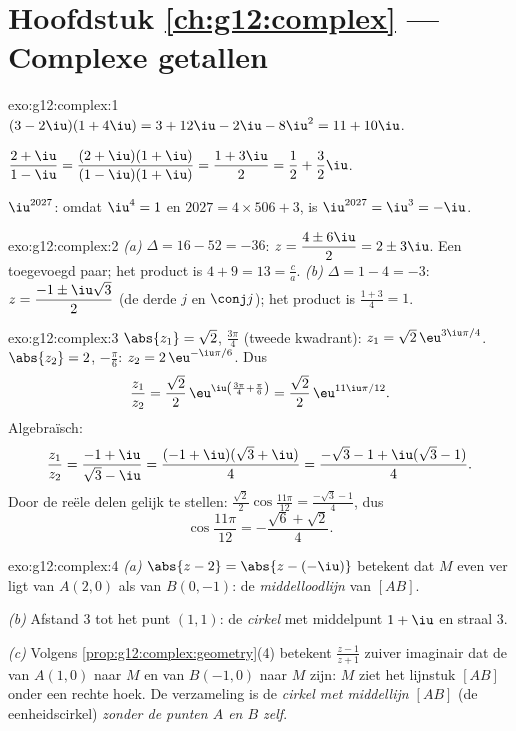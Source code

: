 \section*{Hoofdstuk \ref{ch:g12:complex} --- Complexe getallen}

\begin{solution}{exo:g12:complex:1}
$(3-2\iu)(1+4\iu) = 3 + 12\iu - 2\iu - 8\iu^2 = 11 + 10\iu$.

$\dfrac{2+\iu}{1-\iu} = \dfrac{(2+\iu)(1+\iu)}{(1-\iu)(1+\iu)}
= \dfrac{1 + 3\iu}{2} = \dfrac12 + \dfrac32\iu$.

$\iu^{2027}$: omdat $\iu^4 = 1$ en $2027 = 4 \times 506 + 3$, is
$\iu^{2027} = \iu^3 = -\iu$.
\end{solution}

\begin{solution}{exo:g12:complex:2}
\emph{(a)} $\Delta = 16 - 52 = -36$:
$z = \dfrac{4 \pm 6\iu}{2} = 2 \pm 3\iu$. Een toegevoegd paar; het product is
$4 + 9 = 13 = \frac ca$. \emph{(b)} $\Delta = 1 - 4 = -3$:
$z = \dfrac{-1 \pm \iu\sqrt3}{2}$ (de derde  $j$ en
$\conj j$); het product is $\frac{1 + 3}{4} = 1$.
\end{solution}

\begin{solution}{exo:g12:complex:3}
$\abs{z_1} = \sqrt2$,  $\frac{3\pi}{4}$ (tweede kwadrant):
$z_1 = \sqrt2\,\eu^{3\iu\pi/4}$.
$\abs{z_2} = 2$,  $-\frac\pi6$: $z_2 = 2\,\eu^{-\iu\pi/6}$. Dus
\[
\frac{z_1}{z_2} = \frac{\sqrt2}{2}\,\eu^{\iu\left(\frac{3\pi}{4} + \frac{\pi}{6}\right)}
= \frac{\sqrt2}{2}\,\eu^{11\iu\pi/12}.
\]
Algebraïsch:
\[
\frac{z_1}{z_2} = \frac{-1+\iu}{\sqrt3 - \iu}
= \frac{(-1+\iu)(\sqrt3+\iu)}{4}
= \frac{-\sqrt3 - 1 + \iu(\sqrt3 - 1)}{4}.
\]
Door de reële delen gelijk te stellen:
$\frac{\sqrt2}{2}\cos\frac{11\pi}{12} = \frac{-\sqrt3-1}{4}$, dus
\[
\cos\frac{11\pi}{12} = -\frac{\sqrt6 + \sqrt2}{4}.
\]
\end{solution}

\begin{solution}{exo:g12:complex:4}
\emph{(a)} $\abs{z - 2} = \abs{z - (-\iu)}$ betekent dat $M$ even ver ligt van
$A(2, 0)$ als van $B(0, -1)$: de \emph{middelloodlijn} van $[AB]$.

\emph{(b)} Afstand $3$ tot het punt $(1,1)$: de \emph{cirkel} met middelpunt
$1 + \iu$ en straal $3$.

\emph{(c)} Volgens \cref{prop:g12:complex:geometry}(4) betekent
$\frac{z-1}{z+1}$ zuiver imaginair dat de  van $A(1,0)$ naar $M$ en
van $B(-1,0)$ naar $M$  zijn: $M$ ziet het lijnstuk $[AB]$ onder
een rechte hoek. De verzameling is de \emph{cirkel met middellijn $[AB]$} (de
eenheidscirkel) \emph{zonder de punten $A$ en $B$ zelf}.
\end{solution}

